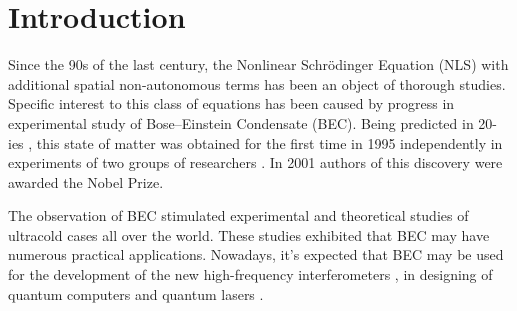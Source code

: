\chapter*{Introduction}
\label{introduction}

Since the 90s of the last century, the Nonlinear Schr\"odinger Equation (NLS) with additional spatial non-autonomous terms has been an object of thorough studies.
Specific interest to this class of equations has been caused by progress in experimental study of Bose--Einstein Condensate (BEC).
Being predicted in 20-ies \cite{Einstein, Bose}, this state of matter was obtained for the first time in 1995 independently in experiments of two groups of researchers \cite{WiemanCornell, Ketterle}.
In 2001 authors of this discovery were awarded the Nobel Prize.

The observation of BEC stimulated experimental and theoretical studies of ultracold cases all over the world.
These studies exhibited that BEC may have numerous practical applications.
Nowadays, it's expected that BEC may be used for the development of the new high-frequency interferometers \cite{GrossZiboldNicklasEsteveOberthaler}, in designing of quantum computers \cite{JakschZoller} and quantum lasers \cite{GuerinRiouGaeblerJosseBouyerAspect}.

